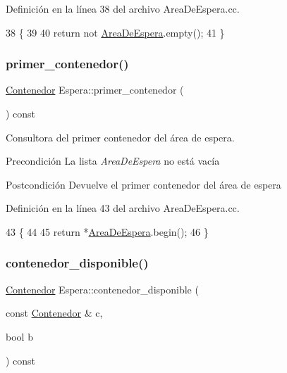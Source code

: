 Definición en la línea 38 del archivo Area\+De\+Espera.\+cc.


\begin{DoxyCode}
38                                     \{
39     
40     \textcolor{keywordflow}{return} not \hyperlink{class_espera_adafca5e22c5bc21e517b363144fc6b18}{AreaDeEspera}.empty();
41 \}
\end{DoxyCode}
\mbox{\label{class_espera_acf8ff210426ca3e799cf667d887e9daa}} 
\subsubsection{\texorpdfstring{primer\+\_\+contenedor()}{primer\_contenedor()}}
{\footnotesize\ttfamily \hyperlink{class_contenedor}{Contenedor} Espera\+::primer\+\_\+contenedor (\begin{DoxyParamCaption}{ }\end{DoxyParamCaption}) const}



Consultora del primer contenedor del área de espera. 

\begin{DoxyPrecond}{Precondición}
La lista {\itshape Area\+De\+Espera} no está vacía 
\end{DoxyPrecond}
\begin{DoxyPostcond}{Postcondición}
Devuelve el primer contenedor del área de espera 
\end{DoxyPostcond}


Definición en la línea 43 del archivo Area\+De\+Espera.\+cc.


\begin{DoxyCode}
43                                            \{
44     
45     \textcolor{keywordflow}{return} *\hyperlink{class_espera_adafca5e22c5bc21e517b363144fc6b18}{AreaDeEspera}.begin();
46 \}
\end{DoxyCode}
\mbox{\label{class_espera_ab4205de26cc518d8130d6506796697ea}} 
\subsubsection{\texorpdfstring{contenedor\+\_\+disponible()}{contenedor\_disponible()}}
{\footnotesize\ttfamily \hyperlink{class_contenedor}{Contenedor} Espera\+::contenedor\+\_\+disponible (\begin{DoxyParamCaption}\item[{const \hyperlink{class_contenedor}{Contenedor} \&}]{c,  }\item[{bool}]{b }\end{DoxyParamCaption}) const}



